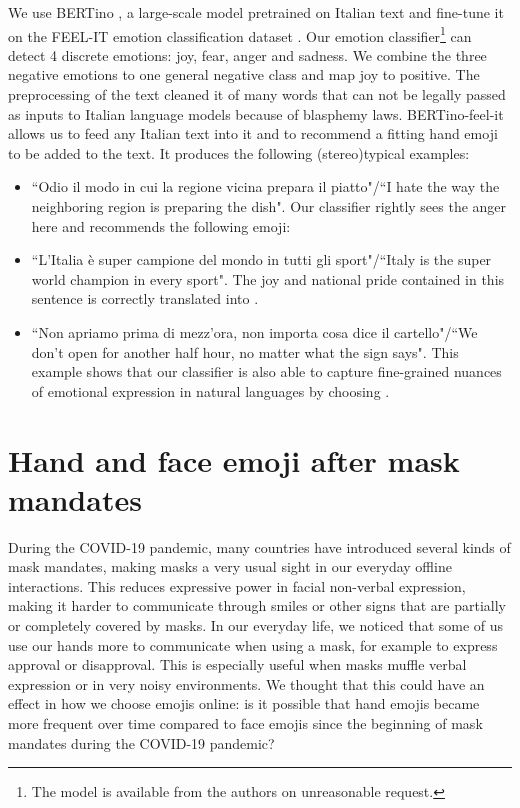 \documentclass{article}
\begin{document}
We use BERTino \cite{muffoBERTinoItalianDistilBERT2020}, a large-scale model pretrained on Italian text and fine-tune it on the FEEL-IT emotion classification dataset \cite{bianchi-etal-2021-feel}. Our emotion classifier\footnote{The model is available from the authors on unreasonable request.} can detect 4 discrete emotions: joy, fear, anger and sadness. We combine the three negative emotions to one general negative class and map joy to positive. The preprocessing of the text cleaned it of many words that can not be legally passed as inputs to Italian language models because of blasphemy laws. BERTino-feel-it allows us to feed any Italian text into it and to recommend a fitting hand emoji to be added to the text. It produces the following (stereo)typical examples:
\begin{itemize}
    \item ``Odio il modo in cui la regione vicina prepara il piatto"/``I hate the way the neighboring region is preparing the dish". Our classifier rightly sees the anger here and recommends the following emoji:

\item ``L'Italia è super campione del mondo in tutti gli sport"/``Italy is the super world champion in every sport". The joy and national pride contained in this sentence is correctly translated into .

\item ``Non apriamo prima di mezz'ora, non importa cosa dice il cartello"/``We don't open for another half hour, no matter what the sign says". This example shows that our classifier is also able to capture fine-grained nuances of emotional expression in natural languages by choosing .
\end{itemize}

\section{Hand and face emoji after mask mandates}

During the COVID-19 pandemic, many countries have introduced several kinds of mask mandates, making masks a very usual sight in our everyday offline interactions. This reduces expressive power in facial non-verbal expression, making it harder to communicate through smiles or other signs that are partially or completely covered by masks. In our everyday life, we noticed that some of us use our hands more to communicate when using a mask, for example to express approval or disapproval. This is especially useful when masks muffle verbal expression or in very noisy environments. We thought that this could have an effect in how we choose emojis online: is it possible that hand emojis became more frequent over time compared to face emojis since the beginning of mask mandates during the COVID-19 pandemic?
\end{document}
